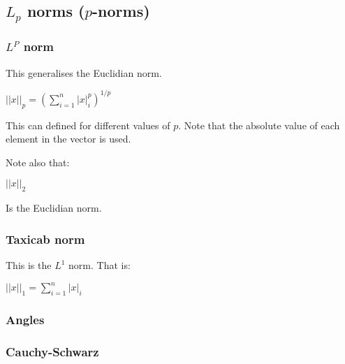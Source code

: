 
\subsection{\(L_p\) norms (\(p\)-norms)}
\subsubsection{\(L^P\) norm}

This generalises the Euclidian norm.

$||x||_p=(\sum_{i=1}^{n}|x|^p_i)^{1/p}$

This can defined for different values of \(p\). Note that the absolute value of each element in the vector is used.

Note also that:

$||x||_2$

Is the Euclidian norm.

\subsubsection{Taxicab norm}

This is the \(L^1\) norm. That is:

$||x||_1=\sum_{i=1}^{n}|x|_i$

\subsubsection{Angles}

\subsubsection{Cauchy-Schwarz}


